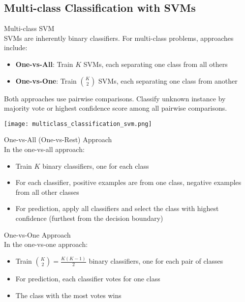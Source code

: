 \subsection{Multi-class Classification with SVMs}

\begin{concept}{Multi-class SVM}\\
SVMs are inherently binary classifiers. For multi-class problems, approaches include:
\begin{itemize}
    \item \textbf{One-vs-All}: Train $K$ SVMs, each separating one class from all others
    \item \textbf{One-vs-One}: Train $\binom{K}{2}$ SVMs, each separating one class from another
\end{itemize}
Both approaches use pairwise comparisons. Classify unknown instance by majority vote or highest confidence score among all pairwise comparisons.

\texttt{[image: multiclass\_classification\_svm.png]}
\end{concept}

\begin{definition}{One-vs-All (One-vs-Rest) Approach}\\
In the one-vs-all approach:
\begin{itemize}
    \item Train $K$ binary classifiers, one for each class
    \item For each classifier, positive examples are from one class, negative examples from all other classes
    \item For prediction, apply all classifiers and select the class with highest confidence (furthest from the decision boundary)
\end{itemize}
\end{definition}

\begin{definition}{One-vs-One Approach}\\
In the one-vs-one approach:
\begin{itemize}
    \item Train $\binom{K}{2} = \frac{K(K-1)}{2}$ binary classifiers, one for each pair of classes
    \item For prediction, each classifier votes for one class
    \item The class with the most votes wins
\end{itemize}
\end{definition}

